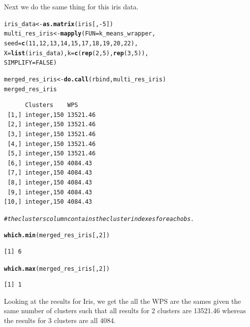 \documentclass[10pt, a4paper, english]{article}\usepackage[]{graphicx}\usepackage[dvipsnames]{xcolor}
\makeatletter
\newcommand{\hlnum}[1]{\textcolor[rgb]{0.686,0.059,0.569}{#1}}%
\newcommand{\hlcom}[1]{\textcolor[rgb]{0.678,0.584,0.686}{\textit{#1}}}%
\newcommand{\hlopt}[1]{\textcolor[rgb]{0,0,0}{#1}}%
\newcommand{\hlstd}[1]{\textcolor[rgb]{0.345,0.345,0.345}{#1}}%
\newcommand{\hlkwb}[1]{\textcolor[rgb]{0.69,0.353,0.396}{#1}}%
\newcommand{\hlkwc}[1]{\textcolor[rgb]{0.333,0.667,0.333}{#1}}%
\newcommand{\hlkwd}[1]{\textcolor[rgb]{0.737,0.353,0.396}{\textbf{#1}}}%
\newenvironment{kframe}{%
 \def\at@end@of@kframe{}%
 \ifinner\ifhmode%
  \def\at@end@of@kframe{\end{minipage}}%
  \begin{minipage}{\columnwidth}%
 \fi\fi%
 \def\FrameCommand##1{\hskip\@totalleftmargin \hskip-\fboxsep
 \colorbox{shadecolor}{##1}\hskip-\fboxsep
     \hskip-\linewidth \hskip-\@totalleftmargin \hskip\columnwidth}%
 \MakeFramed {\advance\hsize-\width
   \@totalleftmargin\z@ \linewidth\hsize
   \@setminipage}}%
 {\par\unskip\endMakeFramed%
 \at@end@of@kframe}
\newenvironment{knitrout}{}{} %
\makeatother
\begin{document}
Next we do the same thing for this iris data.
\begin{knitrout}
\color{fgcolor}\begin{kframe}
\begin{alltt}
\hlstd{iris_data} \hlkwb{<-} \hlkwd{as.matrix}\hlstd{(iris[,}\hlopt{-}\hlnum{5}\hlstd{])}
\hlstd{multi_res_iris} \hlkwb{<-} \hlkwd{mapply}\hlstd{(}\hlkwc{FUN}\hlstd{= k_means_wrapper,}
                         \hlkwc{seed}\hlstd{=}\hlkwd{c}\hlstd{(}\hlnum{11}\hlstd{,}\hlnum{12}\hlstd{,}\hlnum{13}\hlstd{,}\hlnum{14}\hlstd{,}\hlnum{15}\hlstd{,}\hlnum{17}\hlstd{,}\hlnum{18}\hlstd{,}\hlnum{19}\hlstd{,}\hlnum{20}\hlstd{,}\hlnum{22}\hlstd{),}
                         \hlkwc{X}\hlstd{=}\hlkwd{list}\hlstd{(iris_data),} \hlkwc{k}\hlstd{=}\hlkwd{c}\hlstd{(}\hlkwd{rep}\hlstd{(}\hlnum{2}\hlstd{,}\hlnum{5}\hlstd{),}\hlkwd{rep}\hlstd{(}\hlnum{3}\hlstd{,}\hlnum{5}\hlstd{)),}
                         \hlkwc{SIMPLIFY} \hlstd{=} \hlnum{FALSE}\hlstd{)}

\hlstd{merged_res_iris} \hlkwb{<-} \hlkwd{do.call}\hlstd{(rbind, multi_res_iris)}
\hlstd{merged_res_iris}
\end{alltt}
\begin{verbatim}
      Clusters    WPS     
 [1,] integer,150 13521.46
 [2,] integer,150 13521.46
 [3,] integer,150 13521.46
 [4,] integer,150 13521.46
 [5,] integer,150 13521.46
 [6,] integer,150 4084.43 
 [7,] integer,150 4084.43 
 [8,] integer,150 4084.43 
 [9,] integer,150 4084.43 
[10,] integer,150 4084.43 
\end{verbatim}
\begin{alltt}
\hlcom{#the clusters column contains the cluster indexes for each obs.}

\hlkwd{which.min}\hlstd{(merged_res_iris[,}\hlnum{2}\hlstd{])}
\end{alltt}
\begin{verbatim}
[1] 6
\end{verbatim}
\begin{alltt}
\hlkwd{which.max}\hlstd{(merged_res_iris[,}\hlnum{2}\hlstd{])}
\end{alltt}
\begin{verbatim}
[1] 1
\end{verbatim}
\end{kframe}
\end{knitrout}
Looking at the results for Iris, we get the all the WPS are the sames given the same number of clusters such that all results for 2 clusters are 13521.46 whereas the results for 3 clusters are all 4084.  
\end{document}
